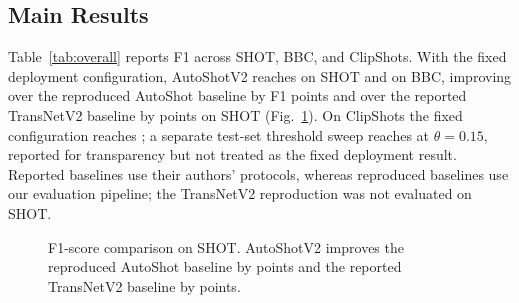 \subsection{Main Results}

Table~\ref{tab:overall} reports F1 across SHOT, BBC, and ClipShots. With the
fixed deployment configuration, AutoShotV2 reaches
\PaperDeployShotFOne{} on SHOT and \PaperDeployBBCFOne{} on BBC, improving
over the reproduced AutoShot baseline by \PaperDeployVsAutoShotPP{} F1
points and over the reported TransNetV2 baseline by
\PaperDeployVsTransNetPP{} points on SHOT (Fig.~\ref{fig:bars}). On
ClipShots the fixed configuration reaches \PaperDeployClipFOne{}; a separate
test-set threshold sweep reaches \PaperDeployClipBestFOne{} at
$\theta=0.15$, reported for transparency but not treated as the fixed
deployment result. Reported baselines use their authors' protocols, whereas
reproduced baselines use our evaluation pipeline; the TransNetV2
reproduction was not evaluated on SHOT.

\begin{table}[!t]
\caption{F1-Score Comparison Across Evaluation Datasets}
\label{tab:overall}
\centering
\small
\renewcommand{\arraystretch}{1.08}
\end{table}

\begin{figure}[!t]
\centering
{}
\caption{F1-score comparison on SHOT. AutoShotV2 improves the reproduced
AutoShot baseline by \PaperDeployVsAutoShotPP{} points and the reported
TransNetV2 baseline by \PaperDeployVsTransNetPP{} points.}
\label{fig:bars}
\end{figure}

